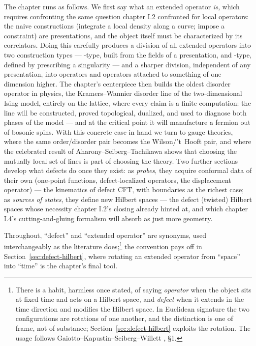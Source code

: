 The chapter runs as follows. We first say what an extended operator
\emph{is}, which requires confronting the same question chapter I.2
confronted for local operators: the naive constructions (integrate a local
density along a curve; impose a constraint) are presentations, and the
object itself must be characterized by its correlators. Doing this
carefully produces a division of all extended operators into two
construction types --- -type, built from the fields of a
presentation, and -type, defined by prescribing a
singularity --- and a sharper division, independent of any presentation,
into  operators and operators attached to something of one
dimension higher. The chapter's centerpiece then builds the oldest
disorder operator in physics, the Kramers--Wannier disorder line of the
two-dimensional Ising model, entirely on the lattice, where every claim is
a finite computation: the line will be constructed, proved topological,
dualized, and used to diagnose both phases of the model --- and at the
critical point it will manufacture a fermion out of bosonic spins. With
this concrete case in hand we turn to gauge theories, where the same
order/disorder pair becomes the Wilson/'t~Hooft pair, and where the
celebrated result of Aharony--Seiberg--Tachikawa shows that choosing the
mutually local set of lines is part of choosing the theory. Two further
sections develop what defects do once they exist: as \emph{probes}, they
acquire conformal data of their own (one-point functions, defect-localized
operators, the displacement operator) --- the kinematics of defect CFT,
with boundaries as the richest case; as \emph{sources of states}, they
define new Hilbert spaces --- the defect (twisted) Hilbert spaces whose
necessity chapter I.2's closing already hinted at, and which chapter I.4's
cutting-and-gluing formalism will absorb as just more geometry.

Throughout, ``defect'' and ``extended operator'' are synonyms, used
interchangeably as the literature does;\footnote{There is a habit, harmless
once stated, of saying \emph{operator} when the object sits at fixed time
and acts on a Hilbert space, and \emph{defect} when it extends in the time
direction and modifies the Hilbert space. In Euclidean signature the two
configurations are rotations of one another, and the distinction is one of
frame, not of substance; Section~\ref{sec:defect-hilbert} exploits the
rotation. The usage follows Gaiotto--Kapustin--Seiberg--Willett
, \S1.} the convention pays off in
Section~\ref{sec:defect-hilbert}, where rotating an extended operator from
``space'' into ``time'' is the chapter's final tool.


